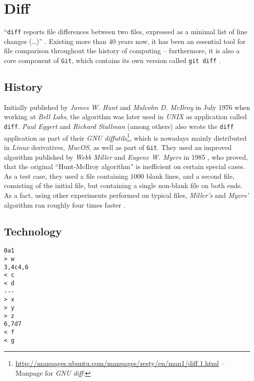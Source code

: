 \section{Diff}
\label{sec:diff}

``\texttt{diff} reports file differences between two files, expressed as a minimal list of line changes (\ldots)'' \cite[1]{Hunt1976}. Existing more than 40 years now, it has been an essential tool for file comparison throughout the history of computing -- furthermore, it is also a core component of \texttt{Git}, which contains its own version called \texttt{git diff} \cite[108]{loeliger2012version}.

\subsection{History}
\label{sec:diff-history}
Initially published by \emph{James W. Hunt} and \emph{Malcolm D. McIlroy} in July 1976 when working at \emph{Bell Labs}, the algorithm was later used in \emph{UNIX} as application called \texttt{diff}. \emph{Paul Eggert} and \emph{Richard Stallman} (among others) also wrote the \texttt{diff} application as part of their \emph{GNU diffutils}\footnote{\url{http://manpages.ubuntu.com/manpages/zesty/en/man1/diff.1.html} -- Manpage for \emph{GNU diff}.}, which is nowadays mainly distributed in \emph{Linux} derivatives, \emph{MacOS}, as well as part of \texttt{Git}. They used an improved algorithm published by \emph{Webb Miller} and \emph{Eugene W. Myers} in 1985 \cite[3]{mackenzie2003comparing}, who proved, that the original ``Hunt-McIlroy algorithm'' is inefficient on certain special cases. As a test case, they used a file containing 1000 blank lines, and a second file, consisting of the initial file, but containing a single non-blank file on both ends. As a fact, using other experiments performed on typical files, \emph{Miller's} and \emph{Myers'} algorithm ran roughly four times faster \cite[p. 1034f]{miller1985file}.

\subsection{Technology}
\label{sec:diff-technology}

\begin{lstlisting}[label={list:diff-normalformat}, caption=sample.diff]
0a1
> w
3,4c4,6
< c
< d
---
> x
> y
> z
6,7d7
< f
< g
\end{lstlisting}

